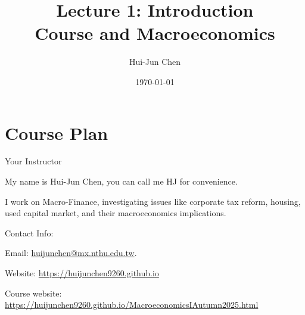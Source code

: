 \documentclass[11pt,aspectratio=169,usenames,dvipsnames]{beamer}
\title[Lecture 1]{Lecture 1: Introduction \\ Course and Macroeconomics}
\author[Hui-Jun Chen]{Hui-Jun Chen}
\institute{National Tsing Hua University}
\date{\today}
\let\tempone\itemize
\let\temptwo\enditemize
\renewenvironment{itemize}{\tempone\addtolength{\itemsep}{\fill}}{\temptwo}
\begin{document}
\begin{frame}[plain]
    \titlepage
\end{frame}

\section{Course Plan}
\label{sec:Course_Plan}

\begin{frame}{Your Instructor}
\label{slide:Your_Instructor}
    \begin{itemize}
        \item My name is \alert{Hui-Jun Chen}, you can call me HJ for convenience.
        \item I work on \alert{Macro-Finance}, investigating issues like \alert{corporate tax reform}, \alert{housing}, \alert{used capital market}, and their macroeconomics implications.
        \item Contact Info:
        \begin{itemize}
            \item Email: \href{huijunchen@mx.nthu.edu.tw}{huijunchen@mx.nthu.edu.tw}.
            \item Website: \href{https://huijunchen9260.github.io/}{https://huijunchen9260.github.io}
            \item Course website: \href{https://huijunchen9260.github.io/MacroeconomicsIAutumn2025.html}{https://huijunchen9260.github.io/MacroeconomicsIAutumn2025.html}
        \end{itemize}
    \end{itemize}
\end{frame}
\end{document}

